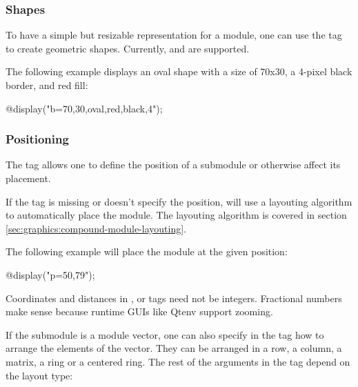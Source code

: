 \subsubsection{Shapes}
\label{sec:graphics:submodule-shapes}

To have a simple but resizable representation for a module, one can use the
 tag to create geometric shapes. Currently,  and
 are supported.

The following example displays an oval shape with a size of 70x30, a 4-pixel
black border, and red fill:

\begin{ned}
@display("b=70,30,oval,red,black,4");
\end{ned}

\begin{center}
\end{center}

\subsubsection{Positioning}
\label{sec:graphics:submodule-positioning}

The  tag allows one to define the position of a submodule or otherwise affect its placement.

\begin{note}
If the  tag is missing or doesn't specify the position, {\opp} will use a
layouting algorithm to automatically place the module. The layouting algorithm
is covered in section \ref{sec:graphics:compound-module-layouting}.
\end{note}

The following example will place the module at the given position:

\begin{ned}
@display("p=50,79");
\end{ned}

\begin{note}
Coordinates and distances in ,  or  tags need not
be integers. Fractional numbers make sense because runtime GUIs like
Qtenv support zooming.
\end{note}

If the submodule is a module vector, one can also specify in the 
tag how to arrange the elements of the vector. They can be arranged in a
row, a column, a matrix, a ring or a centered ring. The rest of the arguments in the 
tag depend on the layout type:

